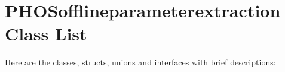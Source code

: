 \section{PHOSofflineparameterextraction Class List}
Here are the classes, structs, unions and interfaces with brief descriptions:\begin{CompactList}
\item{}
\item{}
\end{CompactList}
